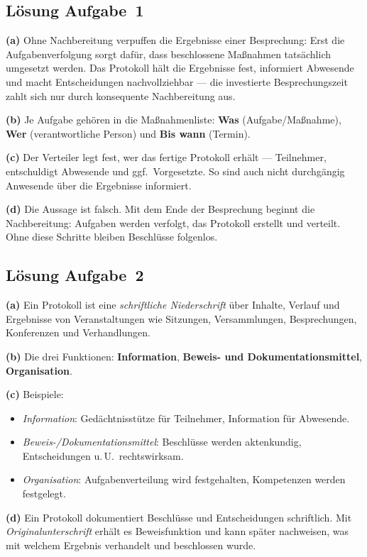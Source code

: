 \documentclass[11pt, a4paper]{article}
\begin{document}
\subsection*{Lösung Aufgabe~1}
\begin{loesung}
\textbf{(a)} Ohne Nachbereitung verpuffen die Ergebnisse einer Besprechung: Erst die
Aufgabenverfolgung sorgt dafür, dass beschlossene Maßnahmen tatsächlich umgesetzt werden.
Das Protokoll hält die Ergebnisse fest, informiert Abwesende und macht Entscheidungen
nachvollziehbar --- die investierte Besprechungszeit zahlt sich nur durch konsequente
Nachbereitung aus.

\textbf{(b)} Je Aufgabe gehören in die Maßnahmenliste: \textbf{Was} (Aufgabe/Maßnahme),
\textbf{Wer} (verantwortliche Person) und \textbf{Bis wann} (Termin).

\textbf{(c)} Der Verteiler legt fest, wer das fertige Protokoll erhält --- Teilnehmer,
entschuldigt Abwesende und ggf.\ Vorgesetzte. So sind auch nicht durchgängig Anwesende
über die Ergebnisse informiert.

\textbf{(d)} Die Aussage ist falsch. Mit dem Ende der Besprechung beginnt die
Nachbereitung: Aufgaben werden verfolgt, das Protokoll erstellt und verteilt. Ohne diese
Schritte bleiben Beschlüsse folgenlos.
\end{loesung}

\subsection*{Lösung Aufgabe~2}
\begin{loesung}
\textbf{(a)} Ein Protokoll ist eine \emph{schriftliche Niederschrift} über Inhalte,
Verlauf und Ergebnisse von Veranstaltungen wie Sitzungen, Versammlungen, Besprechungen,
Konferenzen und Verhandlungen.

\textbf{(b)} Die drei Funktionen: \textbf{Information}, \textbf{Beweis- und
Dokumentationsmittel}, \textbf{Organisation}.

\textbf{(c)} Beispiele:
\begin{itemize}[itemsep=0pt]
  \item \emph{Information}: Gedächtnisstütze für Teilnehmer, Information für Abwesende.
  \item \emph{Beweis-/Dokumentationsmittel}: Beschlüsse werden aktenkundig, Entscheidungen u.\,U.\ rechtswirksam.
  \item \emph{Organisation}: Aufgabenverteilung wird festgehalten, Kompetenzen werden festgelegt.
\end{itemize}

\textbf{(d)} Ein Protokoll dokumentiert Beschlüsse und Entscheidungen schriftlich. Mit
\emph{Originalunterschrift} erhält es Beweisfunktion und kann später nachweisen, was mit
welchem Ergebnis verhandelt und beschlossen wurde.
\end{loesung}
\end{document}
